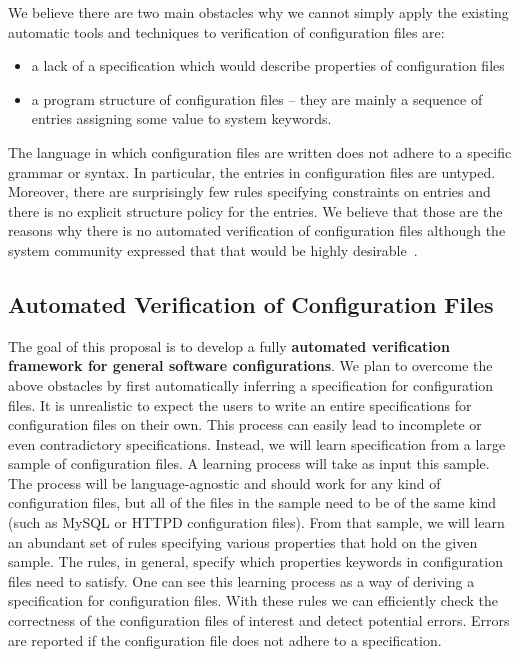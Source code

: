 We believe there are two main obstacles 
why we cannot simply apply the existing automatic 
tools and techniques to verification of configuration files are:
\begin{itemize}
\item a lack
of a specification which would describe properties of configuration files
\item a program structure of configuration files -- they
are mainly a sequence of entries assigning some value to system keywords. 
\end{itemize}
The language in which configuration files are written does 
not adhere to a specific grammar or syntax. In particular, the
entries in configuration files are untyped. Moreover, there are surprisingly few rules specifying constraints on entries and there
is no explicit structure policy for the entries.
We believe that those are the reasons why there is no automated verification of configuration 
files although the system community expressed that that would be highly
desirable~\cite{wang04automatic, zhang14encore, xu15systems}.


\subsection{Automated Verification of Configuration Files}
\label{sec:intro-goal}

The goal of this proposal is to develop a fully {\bf {automated 
verification  framework for general software configurations}}. We plan to
overcome the above obstacles by first automatically inferring a
specification for configuration files. It is unrealistic to expect the 
users to write an entire specifications for configuration files on their own. 
This process can easily lead to incomplete or even contradictory 
specifications. Instead, we will learn specification from 
a large sample of 
configuration files. A learning process will take as input this 
sample. The process will be language-agnostic and should work for any kind 
of configuration files,  but all of the files in the sample need to be of 
the same kind (such as MySQL or 
HTTPD configuration files). From that sample, we will learn an abundant set of rules 
specifying various properties that hold on the given sample. The rules, in general, 
specify which properties keywords in configuration files need to satisfy. One can see this learning process as 
a way of deriving  a specification for configuration files. With these  rules we can efficiently check 
the correctness of the configuration files of interest and detect 
potential errors. Errors are reported if the configuration file does not 
adhere to a specification.

